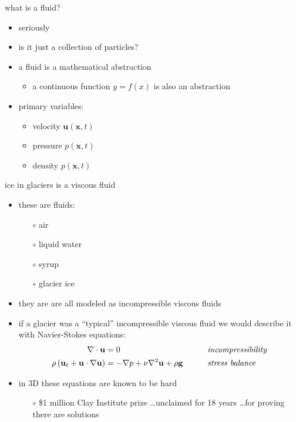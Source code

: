 \documentclass[hide notes,intlimits]{beamer}
\newcommand{\bx}{\mathbf{x}}
\begin{document}
\begin{frame}{what is a fluid?}

\bigskip
\begin{itemize}
\item seriously
\item<2-> is it just a collection of particles?
\item<3-> a fluid is a mathematical abstraction
  \begin{itemize}
  \item<3->[$\circ$]   a continuous function $y=f(x)$ is also an abstraction
  \end{itemize}
\item<4-> primary variables:
  \begin{itemize}
  \item<4->[$\circ$]   velocity $\mathbf{u}(\bx,t)$
  \item<4->[$\circ$]   pressure $p(\bx,t)$
  \item<4->[$\circ$]   density $p(\bx,t)$
  \end{itemize}
\end{itemize}
\end{frame}



\begin{frame}{ice in glaciers is a viscous fluid}

\begin{itemize}
\item these are fluids:
  \begin{itemize}
  \item[$\circ$] air
  \item[$\circ$] liquid water
  \item[$\circ$] syrup
  \item[$\circ$] glacier ice
  \end{itemize}
\item they are are all modeled as \alert{incompressible viscous fluids}
\item if a glacier was a ``typical'' incompressible viscous fluid we would describe it with Navier-Stokes equations:
\begin{align*}
\nabla \cdot \mathbf{u} &= 0 &&\qquad \text{\emph{incompressibility}} \\
\rho \left(\mathbf{u}_t + \mathbf{u}\cdot\nabla \mathbf{u}\right) &= -\nabla p + \nu \nabla^2 \mathbf{u} + \rho \mathbf{g} &&\qquad \text{\emph{stress balance}}
\end{align*}
\item in 3D these equations are known to be hard
  \begin{itemize}
  \item[$\circ$] \$1 million Clay Institute prize \dots unclaimed for 18 years \dots for proving there are solutions
  \end{itemize}
\end{itemize}
\end{frame}
\end{document}

